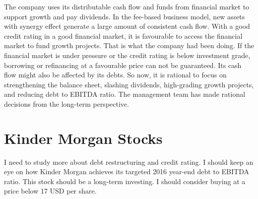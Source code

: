 \documentclass[11pt]{article}
\begin{document}
The company uses its distributable cash flow and funds from financial market to support growth and pay dividends. In the fee-based business model, new assets with synergy effect generate a large amount of consistent cash flow. With a good credit rating in a good financial market, it is favourable to access the financial market to fund growth projects. That is what the company had been doing. If the financial market is under pressure or the credit rating is below investment grade, borrowing or refinancing at a favourable price can not be guaranteed. Its cash flow might also be affected by its debts. So now, it is rational to focus on strengthening the balance sheet, slashing dividends, high-grading growth projects, and reducing debt to EBITDA ratio. The management team has made rational decisions from the long-term perspective. 

\section{Kinder Morgan Stocks}
I need to study more about debt restructuring and credit rating. I should keep an eye on how Kinder Morgan achieves its targeted 2016 year-end debt to EBITDA ratio. This stock should be a long-term investing. I should consider buying at a price below 17 USD per share.
\end{document}
